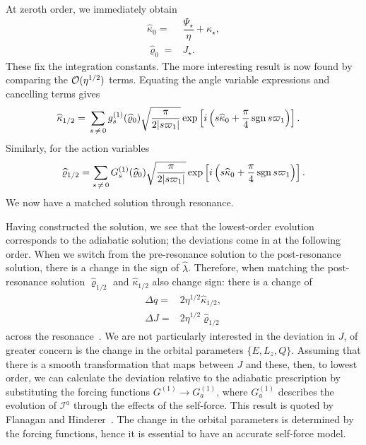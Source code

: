 At zeroth order, we immediately obtain
\begin{align}
\widehat{\kappa}_0 = {} & \dfrac{\Psi_\star}{\eta} + \kappa_\star, \\
\widehat{\varrho}_0 = {} & J_\star.
\end{align}
These fix the integration constants. The more interesting result is now found by comparing the $\mathcal{O}({\eta^{1/2}})$ terms. Equating the angle variable expressions and cancelling terms gives
\begin{align}
\widehat{\kappa}_{1/2} = {} & \sum_{s\,\neq\,0}g_s^{(1)}(\widehat{\varrho}_0)\sqrt{\dfrac{\pi}{2|s\varpi_1|}}\exp\left[i\left(s \widehat{\kappa}_0 + \dfrac{\pi}{4}\operatorname{sgn} s\varpi_1\right)\right].
\end{align}
Similarly, for the action variables
\begin{equation}
\widehat{\varrho}_{1/2} = \sum_{s\,\neq\,0}G_s^{(1)}(\widehat{\varrho}_0)\sqrt{\dfrac{\pi}{2|s\varpi_1|}}\exp\left[i\left(s \widehat{\kappa}_0 + \dfrac{\pi}{4}\operatorname{sgn} s\varpi_1\right)\right].
\label{eq:J-1/2}
\end{equation}
We now have a matched solution through resonance.

Having constructed the solution, we see that the lowest-order evolution corresponds to the adiabatic solution; the deviations come in at the following order. When we switch from the pre-resonance solution to the post-resonance solution, there is a change in the sign of $\widehat{\lambda}$. Therefore, when matching the post-resonance solution $\widehat{\varrho}_{1/2}$ and $\widehat{\kappa}_{1/2}$ also change sign: there is a change of
\begin{align}
\Delta q = {} & 2 \eta^{1/2}\widehat{\kappa}_{1/2}, \\
\Delta J = {} & 2 \eta^{1/2}\widehat{\varrho}_{1/2}
\label{eq:jumps}
\end{align}
across the resonance~\cite{Kevorkian1987}. We are not particularly interested in the deviation in $J$, of greater concern is the change in the orbital parameters $\{E,L_z,Q\}$. Assuming that there is a smooth transformation that maps between $J$ and these, then, to lowest order, we can calculate the deviation relative to the adiabatic prescription by substituting the forcing functions $G^{(1)} \rightarrow G_a^{(1)}$, where $G_a^{(1)}$ describes the evolution of $\mathcal{I}^a$ through the effects of the self-force. This result is quoted by Flanagan and Hinderer~\cite{Flanagan2012}. The change in the orbital parameters is determined by the forcing functions, hence it is essential to have an accurate self-force model.

